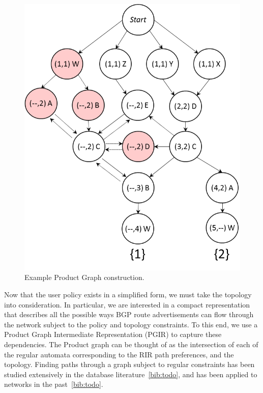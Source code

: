 \begin{figure}
\begin{minipage}[t]{.5\linewidth}
  
  \end{minipage}
  ~~
  ~~
  \begin{minipage}[t]{.5\linewidth}
  \vspace*{-1\baselineskip}

  \includegraphics[width=.8\columnwidth]{figures/productgraph}
  
  \end{minipage}

  \hrulefill

  \caption{Example Product Graph construction.}
  \label{fig:example-compilation}
\end{figure}


Now that the user policy exists in a simplified form, we must take the topology into consideration. In particular, we are interested in a compact representation that describes all the possible ways BGP route advertisements can flow through the network subject to the policy and topology constraints. To this end, we use a Product Graph Intermediate Representation (PGIR) to capture these dependencies. The Product graph can be thought of as the intersection of each of the regular automata corresponding to the RIR path preferences, and the topology. Finding paths through a graph subject to regular constraints has been studied extensively in the database literature~\ref{bib:todo}, and has been applied to networks in the past~\ref{bib:todo}.

